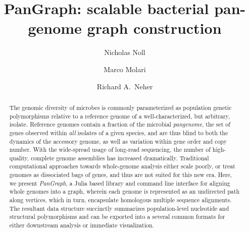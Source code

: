 \documentclass[aps,rmp,reprint,superscriptaddress,notitlepage,10pt]{revtex4-1}
\begin{document}
\title{PanGraph: scalable bacterial pan-genome graph construction}
\author{Nicholas Noll}
\author{Marco Molari}
\author{Richard A.~Neher}

\begin{abstract}
    The genomic diversity of microbes is commonly parameterized as population genetic polymorphisms relative to a reference genome of a well-characterized, but arbitrary, isolate.
    Reference genomes contain a fraction of the microbial \emph{pangenome}, the set of genes observed within \emph{all} isolates of a given species, and are thus blind to both the dynamics of the accessory genome, as well as variation within gene order and copy number.
    With the wide-spread usage of long-read sequencing, the number of high-quality, complete genome assemblies has increased dramatically.
    Traditional computational approaches towards whole-genome analysis either scale poorly, or treat genomes as dissociated bags of genes, and thus are not suited for this new era.
    Here, we present \emph{PanGraph}, a Julia based library and command line interface for aligning whole genomes into a graph, wherein each genome is represented as an undirected path along vertices, which in turn, encapsulate homologous multiple sequence alignments.
    The resultant data structure succinctly summarizes population-level nucleotide and structural polymorphisms and can be exported into a several common formats for either downstream analysis or immediate visualization.
\end{abstract}

\maketitle
\end{document}
